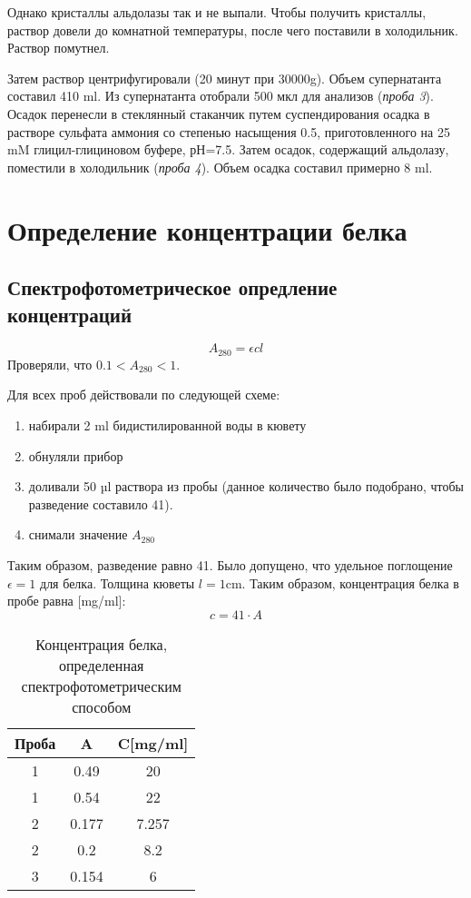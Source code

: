 Однако кристаллы альдолазы так и не выпали.
Чтобы получить кристаллы, раствор довели до комнатной температуры,
после чего поставили в холодильник. Раствор помутнел.

Затем раствор центрифугировали (20 минут при 30000g).
Объем супернатанта составил 410 ml.
Из супернатанта отобрали 500 мкл для анализов (\emph{проба 3}).
Осадок перенесли в стеклянный стаканчик путем суспендирования осадка
в растворе сульфата аммония со степенью насыщения 0.5,
приготовленного на 25 mM глицил-глициновом буфере, рН=7.5.
Затем осадок, содержащий альдолазу, поместили в холодильник (\emph{проба 4}).
Объем осадка составил примерно 8 ml.

\section{Определение концентрации белка}

\subsection{Спектрофотометрическое опредление концентраций}
$$ A_{280} = \epsilon c l $$
Проверяли, что $ 0.1 < A_{280} < 1 $.

Для всех проб действовали по следующей схеме:
\begin{enumerate}
\item набирали 2 ml бидистилированной воды в кювету
\item обнуляли прибор
\item доливали 50 µl раствора из пробы
    (данное количество было подобрано, чтобы разведение составило 41).
\item снимали значение $A_{280}$
\end{enumerate}
Таким образом, разведение равно 41.
Было допущено, что удельное поглощение $\epsilon = 1$ для белка.
Толщина кюветы $l = 1 \text{cm}$.
Таким образом, концентрация белка в пробе равна [mg/ml]:
$$ c=41 \cdot A $$

\begin{table}[htbp]
\caption{Концентрация белка, определенная спектрофотометрическим способом}
\begin{tabular}{|c|c|c|}
\hline
Проба & A & C[mg/ml] \\
\hline
1 & 0.49 & 20 \\
1 & 0.54 & 22 \\
\hline
2 & 0.177 & 7.257 \\
2 & 0.2 & 8.2 \\
\hline
3 & 0.154 & 6 \\
\hline
\end{tabular}
\end{table}

